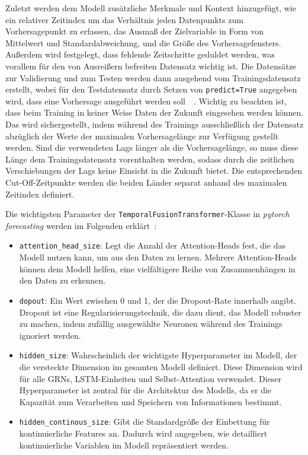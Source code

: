 Zuletzt werden dem Modell zusätzliche Merkmale und Kontext hinzugefügt, wie ein relativer Zeitindex um das Verhältnis jeden Datenpunkts zum Vorhersagepunkt zu erfassen, das Ausmaß der Zielvariable in Form von Mittelwert und Standardabweichung, und die Größe des Vorhersagefensters.
Außerdem wird festgelegt, dass fehlende Zeitschritte geduldet werden, was vorallem für den von Ausreißern befreiten Datensatz wichtig ist.
Die Datensätze zur Validierung und zum Testen werden dann ausgehend vom Trainingsdatensatz erstellt, wobei für den Testdatensatz durch Setzen von \lstinline[columns=fixed]{predict=True} angegeben wird, dass eine Vorhersage ausgeführt werden soll~\cite{Labiadh.2023}~\cite{GitHub.20240307T20:56:16.000Z}.
Wichtig zu beachten ist, dass beim Training in keiner Weise Daten der Zukunft eingesehen werden können.
Das wird sichergestellt, indem während des Trainings ausschließlich der Datensatz abzüglich der Werte der maximalen Vorhersagelänge zur Verfügung gestellt werden.
Sind die verwendeten Lags länger als die Vorhersagelänge, so muss diese Länge dem Trainingsdatensatz vorenthalten werden, sodass durch die zeitlichen Verschiebungen der Lags keine Einsicht in die Zukunft bietet.
Die entsprechenden Cut-Off-Zeitpunkte werden die beiden Länder separat anhand des maximalen Zeitindex definiert.

Die wichtigsten Parameter der \lstinline[columns=fixed]{TemporalFusionTransformer}-Klasse in \textit{pytorch forecasting} werden im Folgenden erklärt~\cite{Joseph.2022}:
\begin{itemize}
  \item \lstinline[columns=fixed]{attention_head_size}: Legt die Anzahl der Attention-Heads fest, die das Modell  nutzen kann, um aus den Daten zu lernen.
 Mehrere Attention-Heads können dem Modell helfen, eine vielfältigere Reihe von Zusammenhängen in den Daten zu erkennen.
  \item \lstinline[columns=fixed]{dopout}: Ein Wert zwischen 0 und 1, der die Dropout-Rate innerhalb angibt.
  Dropout ist eine Regularisierungstechnik, die dazu dient, das Modell robuster zu machen, indem zufällig ausgewählte Neuronen während des Trainings ignoriert werden.
  \item \lstinline[columns=fixed]{hidden_size}: Wahrscheinlich der wichtigste Hyperparameter im Modell, der die versteckte Dimension im gesamten Modell definiert.
 Diese Dimension wird für alle \acp{GRN}, \ac{LSTM}-Einheiten und Selbst-Attention verwendet.
 Dieser Hyperparameter ist zentral für die Architektur des Modells, da er die Kapazität zum Verarbeiten und Speichern von Informationen bestimmt.
 \item \lstinline[columns=fixed]{hidden_continous_size}: Gibt die Standardgröße der Einbettung für kontinuierliche Features an.
 Dadurch wird angegeben, wie detailliert kontinuierliche Variablen im Modell repräsentiert werden.
 \end{itemize}

